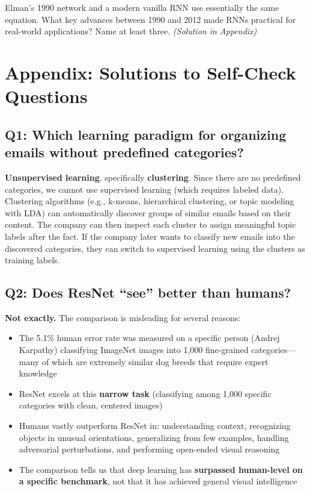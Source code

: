 \documentclass[11pt,a4paper]{article}
\begin{document}
\begin{tcolorbox}[questionbox={Self-Check Q7}]
Elman's 1990 network and a modern vanilla RNN use essentially the same equation. What key advances between 1990 and 2012 made RNNs practical for real-world applications? Name at least three. \textit{(Solution in Appendix)}
\end{tcolorbox}

\newpage
\section*{Appendix: Solutions to Self-Check Questions}

\subsection*{Q1: Which learning paradigm for organizing emails without predefined categories?}

\textbf{Unsupervised learning}, specifically \textbf{clustering}. Since there are no predefined categories, we cannot use supervised learning (which requires labeled data). Clustering algorithms (e.g., k-means, hierarchical clustering, or topic modeling with LDA) can automatically discover groups of similar emails based on their content. The company can then inspect each cluster to assign meaningful topic labels after the fact. If the company later wants to classify new emails into the discovered categories, they can switch to supervised learning using the clusters as training labels.

\subsection*{Q2: Does ResNet ``see'' better than humans?}

\textbf{Not exactly.} The comparison is misleading for several reasons:

\begin{itemize}[leftmargin=1.5em]
    \item The 5.1\% human error rate was measured on a specific person (Andrej Karpathy) classifying ImageNet images into 1,000 fine-grained categories---many of which are extremely similar dog breeds that require expert knowledge
    \item ResNet excels at this \textbf{narrow task} (classifying among 1,000 specific categories with clean, centered images)
    \item Humans vastly outperform ResNet in: understanding context, recognizing objects in unusual orientations, generalizing from few examples, handling adversarial perturbations, and performing open-ended visual reasoning
    \item The comparison tells us that deep learning has \textbf{surpassed human-level on a specific benchmark}, not that it has achieved general visual intelligence
\end{itemize}
\end{document}

